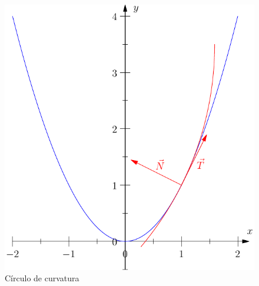 \begin{figure}
\begin{center}
    \includegraphics{./cap_curvas/figs/circulo_curvatura_parabola}
 \caption{Círculo de curvatura}\label{raio_de_curvatura}
  \end{center}
\end{figure}

